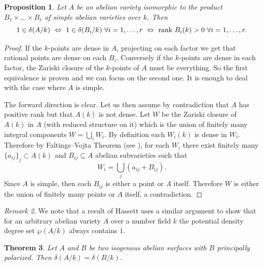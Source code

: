 \documentclass[a4paper,11pt]{amsart}
\theoremstyle{plain}
\newtheorem{thm}{Theorem}[section]
\newtheorem{prop}[thm]{Proposition}
\theoremstyle{remark}
\newtheorem{remark}[thm]{Remark}
\newcommand{\dendegs}{\delta}
\newcommand{\potdendegs}{\wp}
\begin{document}
\begin{prop}\label{prop:simpleabeliansurface}
    Let $A$ be an abelian variety isomorphic to the product $B_1\times \dots \times B_r$ of simple abelian varieties over $k$. 
    Then 
    \[
    1\in \dendegs(A/k)
    \ 
    \Leftrightarrow 
    \
    1\in \dendegs(B_i/k) \ \forall i=1,\dots, r \
    \Leftrightarrow 
    \textup{ rank }B_i(k)>0\ \forall i=1,\dots, r.
    \]
\end{prop}
\begin{proof}
If the $k$-points are dense in $A$, projecting on each factor we get that rational points are dense on each $B_i$.
Conversely if the $k$-points are dense in each factor, the Zariski closure of the $k$-points of $A$ must be everything.
So the first equivalence is proven and we can focus on the second one. 
It is enough to deal with the case where $A$ is simple.


The forward direction is clear. 
Let us then assume by contradiction that $A$ has positive rank but that $A(k)$ is not dense.
Let $W$ be the Zariski closure of $A(k)$ in $A$ (with reduced structure on it) which is the union of finitely many integral components $W=\bigcup_i W_i$.
By definition each $W_i(k)$ is dense in $W_i$.
Therefore by Faltings--Vojta Theorem (see \cite[Cor. of Thm. 3.1]{Maz00}), for each $W_i$ there exist finitely many $\{a_{ij}\}_j\subset A(k)$ and $B_{ij}\subseteq A$ abelian subvarieties such that 
\[
W_i = \bigcup_j ( a_{ij}+ B_{ij} ).
\]
Since $A$ is simple, then each $B_{ij}$ is either a point or $A$ itself. 
Therefore $W$ is either the union of finitely many points or $A$ itself, a contradiction.
\end{proof}

\begin{remark}
We note that a result of Hassett \cite[Part II, Proposition 4.2]{Hassett2003}  uses a similar argument to show that for an arbitrary abelian variety $A$ over a number field $k$ the potential density degree set $\potdendegs(A/k)$ always contains $1$.
\end{remark}


\begin{thm}\label{thm:isogeneousabsurf}
Let $A$ and $B$ be two isogenous abelian surfaces with $B$ principally polarized. Then $\dendegs(A/k)=\dendegs(B/k)$. 
\end{thm}
   
\end{document}
